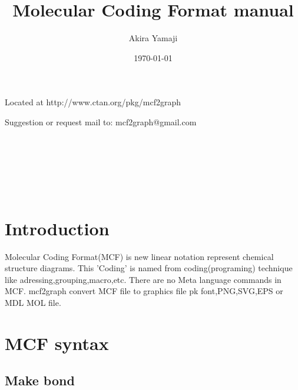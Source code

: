 \documentclass[a4paper]{article}
\begin{document}
\title{\Huge\sf Molecular Coding Format manual}
\author{Akira Yamaji}
\date{\today}
\maketitle
\begin{center} Located at http://www.ctan.org/pkg/mcf2graph \end{center}
\begin{center} Suggestion or request mail to: mcf2graph@gmail.com \end{center}
\thispagestyle{empty}
\vspace{3mm}%
\begin{center}
{\@strufont%
 \raisebox{10mm}{\char2 } \raisebox{10mm}{\char4}\\
 \raisebox{10mm}{\char6 } \raisebox{10mm}{\char8}\\
 \raisebox{10mm}{\char10}\raisebox{10mm}{\char12}\\
\raisebox{10mm}{\char14}\raisebox{10mm}{\char16}\\
\raisebox{10mm}{\char18}\raisebox{10mm}{\char20}\\
}%
\end{center}
\twocolumn
\thispagestyle{empty}
\tableofcontents
\linethickness{0.08mm}%
\newpage
\section{Introduction}
Molecular Coding Format(MCF) is new linear notation
represent chemical structure diagrams.
This 'Coding' is named from coding(programing) technique
like adressing,grouping,macro,etc. 
There are no Meta language commands in MCF.
mcf2graph convert MCF file to graphics file
pk font,PNG,SVG,EPS or MDL MOL file.
\section{MCF syntax}
\subsection{Make bond}
\end{document}
